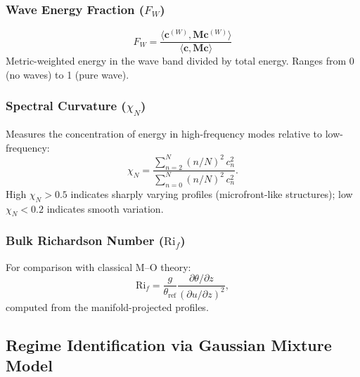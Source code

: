 \documentclass[11pt,a4paper]{article}
\begin{document}
\subsubsection{Wave Energy Fraction ($F_W$)}

\begin{equation}
F_W = \frac{\langle \mathbf{c}^{(W)}, \mathbf{M} \mathbf{c}^{(W)} \rangle}{\langle \mathbf{c}, \mathbf{M} \mathbf{c} \rangle}
\label{eq:f_w}
\end{equation}
Metric-weighted energy in the wave band divided by total energy. Ranges from 0 (no waves) to 1 (pure wave).

\subsubsection{Spectral Curvature ($\chi_N$)}

Measures the concentration of energy in high-frequency modes relative to low-frequency:
\begin{equation}
\chi_N = \frac{\sum_{n=2}^{N} (n/N)^2 \, c_n^2}{\sum_{n=0}^{N} (n/N)^2 \, c_n^2}.
\label{eq:chi_n}
\end{equation}
High $\chi_N > 0.5$ indicates sharply varying profiles (microfront-like structures); low $\chi_N < 0.2$ indicates smooth variation.

\subsubsection{Bulk Richardson Number ($\mathrm{Ri}_f$)}

For comparison with classical M--O theory:
\begin{equation}
\mathrm{Ri}_f = \frac{g}{\theta_{\mathrm{ref}}} \frac{\partial \theta / \partial z}{(\partial u / \partial z)^2},
\label{eq:rif}
\end{equation}
computed from the manifold-projected profiles.

\subsection{Regime Identification via Gaussian Mixture Model}
\label{sec:methods:clustering}
\end{document}
